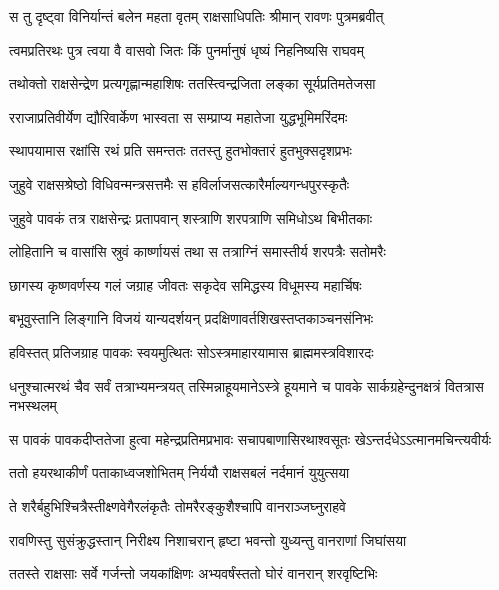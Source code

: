 \twolineshloka
{स तु दृष्ट्वा विनिर्यान्तं बलेन महता वृतम्}
{राक्षसाधिपतिः श्रीमान् रावणः पुत्रमब्रवीत्} %

\twolineshloka
{त्वमप्रतिरथः पुत्र त्वया वै वासवो जितः}
{किं पुनर्मानुषं धृष्यं निहनिष्यसि राघवम्} %

\twolineshloka
{तथोक्तो राक्षसेन्द्रेण प्रत्यगृह्णान्महाशिषः}
{ततस्त्विन्द्रजिता लङ्का सूर्यप्रतिमतेजसा} %

\twolineshloka
{रराजाप्रतिवीर्येण द्यौरिवार्केण भास्वता}
{स सम्प्राप्य महातेजा युद्धभूमिमरिंदमः} %

\twolineshloka
{स्थापयामास रक्षांसि रथं प्रति समन्ततः}
{ततस्तु हुतभोक्तारं हुतभुक्सदृशप्रभः} %

\twolineshloka
{जुहुवे राक्षसश्रेष्ठो विधिवन्मन्त्रसत्तमैः}
{स हविर्लाजसत्कारैर्माल्यगन्धपुरस्कृतैः} %

\twolineshloka
{जुहुवे पावकं तत्र राक्षसेन्द्रः प्रतापवान्}
{शस्त्राणि शरपत्राणि समिधोऽथ बिभीतकाः} %

\twolineshloka
{लोहितानि च वासांसि स्रुवं कार्ष्णायसं तथा}
{स तत्राग्निं समास्तीर्य शरपत्रैः सतोमरैः} %

\twolineshloka
{छागस्य कृष्णवर्णस्य गलं जग्राह जीवतः}
{सकृदेव समिद्धस्य विधूमस्य महार्चिषः} %

\twolineshloka
{बभूवुस्तानि लिङ्गानि विजयं यान्यदर्शयन्}
{प्रदक्षिणावर्तशिखस्तप्तकाञ्चनसंनिभः} %

\twolineshloka
{हविस्तत् प्रतिजग्राह पावकः स्वयमुत्थितः}
{सोऽस्त्रमाहारयामास ब्राह्ममस्त्रविशारदः} %

\threelineshloka
{धनुश्चात्मरथं चैव सर्वं तत्राभ्यमन्त्रयत्}
{तस्मिन्नाहूयमानेऽस्त्रे हूयमाने च पावके}
{सार्कग्रहेन्दुनक्षत्रं वितत्रास नभस्थलम्} %

\twolineshloka
{स पावकं पावकदीप्ततेजा हुत्वा महेन्द्रप्रतिमप्रभावः}
{सचापबाणासिरथाश्वसूतः खेऽन्तर्दधेऽऽत्मानमचिन्त्यवीर्यः} %

\twolineshloka
{ततो हयरथाकीर्णं पताकाध्वजशोभितम्}
{निर्ययौ राक्षसबलं नर्दमानं युयुत्सया} %

\twolineshloka
{ते शरैर्बहुभिश्चित्रैस्तीक्ष्णवेगैरलंकृतैः}
{तोमरैरङ्कुशैश्चापि वानराञ्जघ्नुराहवे} %

\twolineshloka
{रावणिस्तु सुसंक्रुद्धस्तान् निरीक्ष्य निशाचरान्}
{हृष्टा भवन्तो युध्यन्तु वानराणां जिघांसया} %

\twolineshloka
{ततस्ते राक्षसाः सर्वे गर्जन्तो जयकांक्षिणः}
{अभ्यवर्षंस्ततो घोरं वानरान् शरवृष्टिभिः} %

